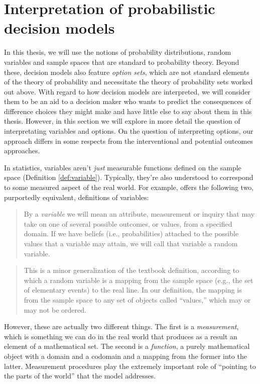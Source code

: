 \section{Interpretation of probabilistic decision models}\label{sec:interp_of_dms}

In this thesis, we will use the notions of probability distributions, random variables and sample spaces that are standard to probability theory. Beyond these, decision models also feature \emph{option sets}, which are not standard elements of the theory of probability and necessitate the theory of probability sets worked out above. With regard to how decision models are interpreted, we will consider them to be an aid to a decision maker who wants to predict the consequences of difference choices they might make and have little else to say about them in this thesis. However, in this section we will explore in more detail the question of interpretating variables and options. On the question of interpreting options, our approach differs in some respects from the interventional and potential outcomes approaches.

In statistics, variables aren't \emph{just} measurable functions defined on the sample space (Definition \ref{def:variable}). Typically, they're also understood to correspond to some measured aspect of the real world. For example, \citet{pearl_causality:_2009} offers the following two, purportedly equivalent, definitions of variables:
\begin{quote}
By a \emph{variable} we will mean an attribute, measurement or inquiry that may take on one of several possible outcomes, or values, from a specified domain. If we have beliefs (i.e., probabilities) attached to the possible values that a variable may attain, we will call that variable a random variable.
\end{quote}

\begin{quote}
This is a minor generalization of the textbook definition, according to which a random variable is a mapping from the sample space (e.g., the set of elementary events) to the real line. In our definition, the mapping is from the sample space to any set of objects called ``values,'' which may or may not be ordered.
\end{quote}

However, these are actually two different things. The first is a \emph{measurement}, which is something we can do in the real world that produces as a result an element of a mathematical set. The second is a \emph{function}, a purely mathematical object with a domain and a codomain and a mapping from the former into the latter. Measurement procedures play the extremely important role of ``pointing to the parts of the world'' that the model addresses.

